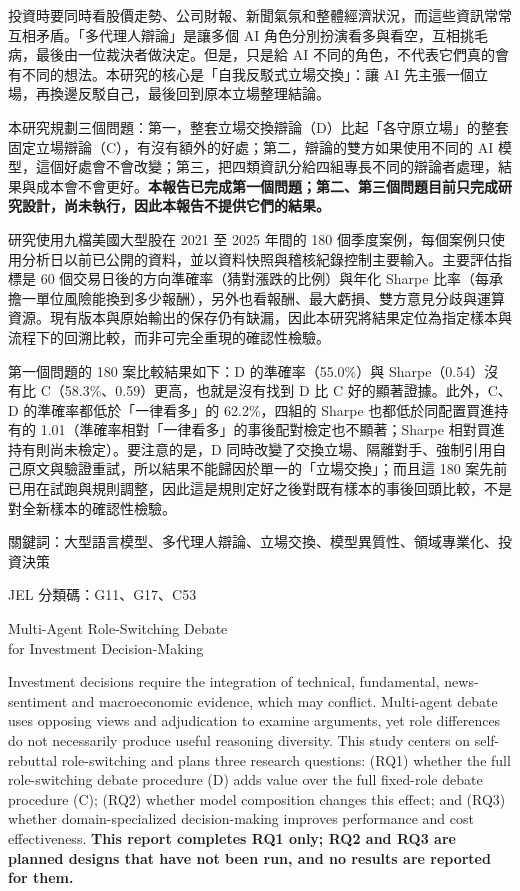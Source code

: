 \documentclass[12pt,a4paper]{article}
\numberwithin{table}{section}
\numberwithin{figure}{section}
\begin{document}
投資時要同時看股價走勢、公司財報、新聞氣氛和整體經濟狀況，而這些資訊常常互相矛盾。「多代理人辯論」是讓多個 AI 角色分別扮演看多與看空，互相挑毛病，最後由一位裁決者做決定。但是，只是給 AI 不同的角色，不代表它們真的會有不同的想法。本研究的核心是「自我反駁式立場交換」：讓 AI 先主張一個立場，再換邊反駁自己，最後回到原本立場整理結論。

本研究規劃三個問題：第一，整套立場交換辯論（D）比起「各守原立場」的整套固定立場辯論（C），有沒有額外的好處；第二，辯論的雙方如果使用不同的 AI 模型，這個好處會不會改變；第三，把四類資訊分給四組專長不同的辯論者處理，結果與成本會不會更好。\textbf{本報告已完成第一個問題；第二、第三個問題目前只完成研究設計，尚未執行，因此本報告不提供它們的結果。}

研究使用九檔美國大型股在 2021 至 2025 年間的 180 個季度案例，每個案例只使用分析日以前已公開的資料，並以資料快照與稽核紀錄控制主要輸入。主要評估指標是 60 個交易日後的方向準確率（猜對漲跌的比例）與年化 Sharpe 比率（每承擔一單位風險能換到多少報酬），另外也看報酬、最大虧損、雙方意見分歧與運算資源。現有版本與原始輸出的保存仍有缺漏，因此本研究將結果定位為指定樣本與流程下的回溯比較，而非可完全重現的確認性檢驗。

第一個問題的 180 案比較結果如下：D 的準確率（55.0\%）與 Sharpe（0.54）沒有比 C（58.3\%、0.59）更高，也就是沒有找到 D 比 C 好的顯著證據。此外，C、D 的準確率都低於「一律看多」的 62.2\%，四組的 Sharpe 也都低於同配置買進持有的 1.01（準確率相對「一律看多」的事後配對檢定也不顯著；Sharpe 相對買進持有則尚未檢定）。要注意的是，D 同時改變了交換立場、隔離對手、強制引用自己原文與驗證重試，所以結果不能歸因於單一的「立場交換」；而且這 180 案先前已用在試跑與規則調整，因此這是規則定好之後對既有樣本的事後回頭比較，不是對全新樣本的確認性檢驗。

\vspace{0.6cm}
\noindent 關鍵詞：大型語言模型、多代理人辯論、立場交換、模型異質性、領域專業化、投資決策

\noindent JEL 分類碼：G11、G17、C53
\clearpage
\begin{center}{\fontsize{16}{24}\selectfont Multi-Agent Role-Switching Debate\\ for Investment Decision-Making\par}\end{center}
\noindent Investment decisions require the integration of technical, fundamental, news-sentiment and macroeconomic evidence, which may conflict. Multi-agent debate uses opposing views and adjudication to examine arguments, yet role differences do not necessarily produce useful reasoning diversity. This study centers on self-rebuttal role-switching and plans three research questions: (RQ1) whether the full role-switching debate procedure (D) adds value over the full fixed-role debate procedure (C); (RQ2) whether model composition changes this effect; and (RQ3) whether domain-specialized decision-making improves performance and cost effectiveness. \textbf{This report completes RQ1 only; RQ2 and RQ3 are planned designs that have not been run, and no results are reported for them.}
\end{document}
